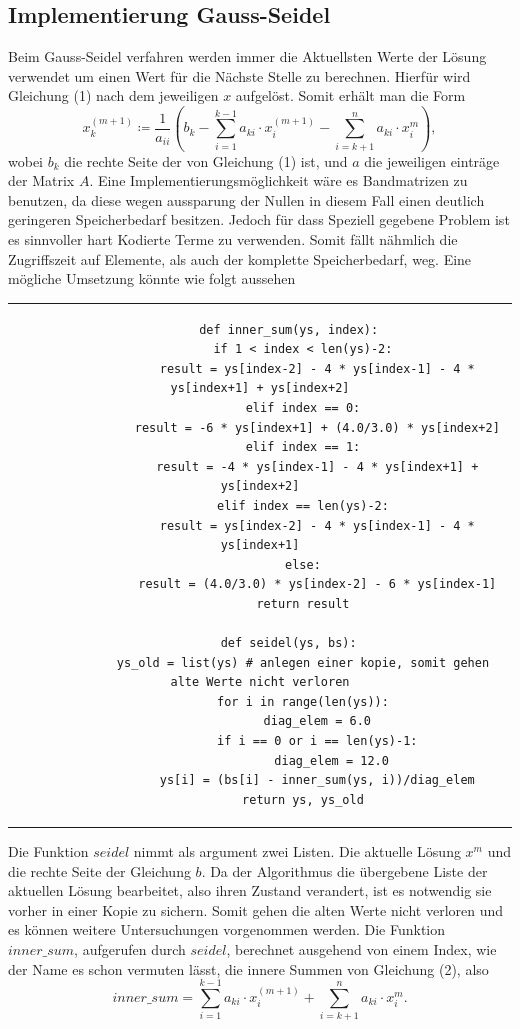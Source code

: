 \documentclass[12pt,titlepage]{article}
\begin{document}
	\subsection{Implementierung Gauss-Seidel}
		
		Beim Gauss-Seidel verfahren werden immer die Aktuellsten Werte der Lösung verwendet um einen Wert für die Nächste Stelle zu berechnen. Hierfür wird Gleichung (1) nach dem jeweiligen $x$ aufgelöst. Somit erhält man die Form
		\begin{equation}
			x_{k}^{(m+1)} \coloneqq \frac{1}{a_{ii}}\left(b_{k} - \sum_{i=1}^{k-1}a_{ki}\cdot x_{i}^{(m+1)} - \sum_{i = k+1}^{n}a_{ki}\cdot x_{i}^m\right),
		\end{equation}
		wobei $b_k$ die rechte Seite der von Gleichung (1) ist, und $a$ die jeweiligen einträge der Matrix $A$.
		Eine Implementierungsmöglichkeit wäre es Bandmatrizen zu benutzen, da diese wegen aussparung der Nullen
		in diesem Fall einen deutlich geringeren Speicherbedarf besitzen. Jedoch für dass Speziell gegebene Problem ist 
		es sinnvoller hart Kodierte Terme zu verwenden. Somit fällt nähmlich die Zugriffszeit auf Elemente, als auch der komplette Speicherbedarf, weg. Eine mögliche Umsetzung könnte wie folgt aussehen \newline
		\newline
		\begin{tabular}{c}
		\begin{lstlisting}
		def inner_sum(ys, index):
		    if 1 < index < len(ys)-2:
		        result = ys[index-2] - 4 * ys[index-1] - 4 * ys[index+1] + ys[index+2]
		    elif index == 0:
		        result = -6 * ys[index+1] + (4.0/3.0) * ys[index+2]
		    elif index == 1:
		        result = -4 * ys[index-1] - 4 * ys[index+1] + ys[index+2]
		    elif index == len(ys)-2:
		        result = ys[index-2] - 4 * ys[index-1] - 4 * ys[index+1]
		    else:
		        result = (4.0/3.0) * ys[index-2] - 6 * ys[index-1]
		    return result
		    
		def seidel(ys, bs):
			ys_old = list(ys) # anlegen einer kopie, somit gehen alte Werte nicht verloren
		    for i in range(len(ys)):
		    	diag_elem = 6.0
		        if i == 0 or i == len(ys)-1:
		        	diag_elem = 12.0
		        ys[i] = (bs[i] - inner_sum(ys, i))/diag_elem
		    return ys, ys_old
	 	\end{lstlisting}
		\end{tabular}
		\newpage
		Die Funktion $seidel$ nimmt als argument zwei Listen. Die aktuelle Lösung  $x^m$ und die rechte Seite der Gleichung $b$. Da der Algorithmus die übergebene Liste der aktuellen Lösung bearbeitet, also ihren Zustand verandert, ist es notwendig sie vorher in einer Kopie zu sichern. Somit gehen die alten Werte nicht verloren
		und es können weitere Untersuchungen vorgenommen werden. Die Funktion $inner\_sum$, aufgerufen durch $seidel$, berechnet ausgehend von einem Index, wie der Name es schon vermuten lässt, die innere Summen von Gleichung (2), also
		\begin{equation*}
			inner\_sum = \sum_{i=1}^{k-1}a_{ki}\cdot x_{i}^{(m+1)} + \sum_{i = k+1}^{n}a_{ki}\cdot x_{i}^m.
		\end{equation*}
		
\end{document}
